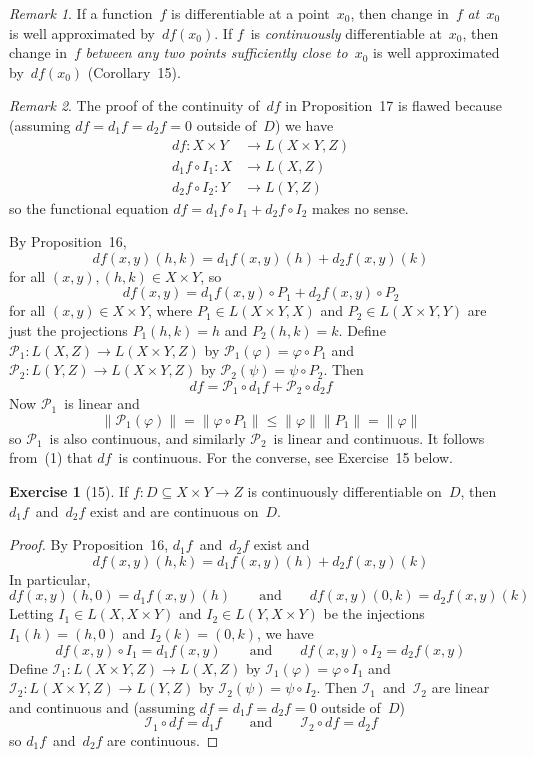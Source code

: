\documentclass[letterpaper,12pt]{article}
\renewcommand{\P}{\mathcal{P}}
\newcommand{\I}{\mathcal{I}}
\newcommand{\after}{\circ}
\newcommand{\df}{d\!f}
\newcommand{\norm}[1]{\lVert{#1}\rVert}
\theoremstyle{plain}
\theoremstyle{definition}
\newtheorem*{exer}{Exercise}
\theoremstyle{remark}
\newtheorem*{rmk}{Remark}
\begin{document}
\begin{rmk}
If a function~\(f\) is differentiable at a point~\(x_0\), then change in~\(f\) \emph{at~\(x_0\)} is well approximated by~\(\df(x_0)\). If \(f\)~is \emph{continuously} differentiable at~\(x_0\), then change in~\(f\) \emph{between any two points sufficiently close to~\(x_0\)} is well approximated by~\(\df(x_0)\) (Corollary~15).
\end{rmk}

\begin{rmk}
The proof of the continuity of~\(\df\) in Proposition~17 is flawed because (assuming \(\df=d_1f=d_2f=0\) outside of~\(D\)) we have
\begin{align*}
\df:X\times Y&\to L(X\times Y,Z)\\
d_1f\after I_1:X&\to L(X,Z)\\
d_2f\after I_2:Y&\to L(Y,Z)
\end{align*}
so the functional equation \(\df=d_1f\after I_1+d_2f\after I_2\) makes no sense.

By Proposition~16,
\[\df(x,y)(h,k)=d_1f(x,y)(h)+d_2f(x,y)(k)\]
for all \((x,y),(h,k)\in X\times Y\), so
\[\df(x,y)=d_1f(x,y)\after P_1+d_2f(x,y)\after P_2\]
for all \((x,y)\in X\times Y\), where \(P_1\in L(X\times Y,X)\) and \(P_2\in L(X\times Y,Y)\) are just the projections \(P_1(h,k)=h\) and \(P_2(h,k)=k\). Define \(\P_1:L(X,Z)\to L(X\times Y,Z)\) by \(\P_1(\varphi)=\varphi\after P_1\) and \(\P_2:L(Y,Z)\to L(X\times Y,Z)\) by \(\P_2(\psi)=\psi\after P_2\). Then
\[\df=\P_1\after d_1f+\P_2\after d_2f\tag{1}\]
Now \(\P_1\)~is linear and
\[\norm{\P_1(\varphi)}=\norm{\varphi\after P_1}\le\norm{\varphi}\norm{P_1}=\norm{\varphi}\]
so \(\P_1\)~is also continuous, and similarly \(\P_2\)~is linear and continuous. It follows from~(1) that \(\df\)~is continuous. For the converse, see Exercise~15 below.
\end{rmk}

\begin{exer}[15]
If \(f:D\subseteq X\times Y\to Z\) is continuously differentiable on~\(D\), then \(d_1f\)~and~\(d_2f\) exist and are continuous on~\(D\).
\end{exer}
\begin{proof}
By Proposition~16, \(d_1f\)~and~\(d_2f\) exist and
\[\df(x,y)(h,k)=d_1f(x,y)(h)+d_2f(x,y)(k)\]
In particular,
\[\df(x,y)(h,0)=d_1f(x,y)(h)\qquad\text{and}\qquad\df(x,y)(0,k)=d_2f(x,y)(k)\]
Letting \(I_1\in L(X,X\times Y)\) and \(I_2\in L(Y,X\times Y)\) be the injections \(I_1(h)=(h,0)\) and \(I_2(k)=(0,k)\), we have
\[\df(x,y)\after I_1=d_1f(x,y)\qquad\text{and}\qquad\df(x,y)\after I_2=d_2f(x,y)\]
Define \(\I_1:L(X\times Y,Z)\to L(X,Z)\) by \(\I_1(\varphi)=\varphi\after I_1\) and \(\I_2:L(X\times Y,Z)\to L(Y,Z)\) by \(\I_2(\psi)=\psi\after I_2\). Then \(\I_1\)~and~\(\I_2\) are linear and continuous and (assuming \(\df=d_1f=d_2f=0\) outside of~\(D\))
\[\I_1\after\df=d_1f\qquad\text{and}\qquad\I_2\after\df=d_2f\]
so \(d_1f\)~and~\(d_2f\) are continuous.
\end{proof}
\end{document}
